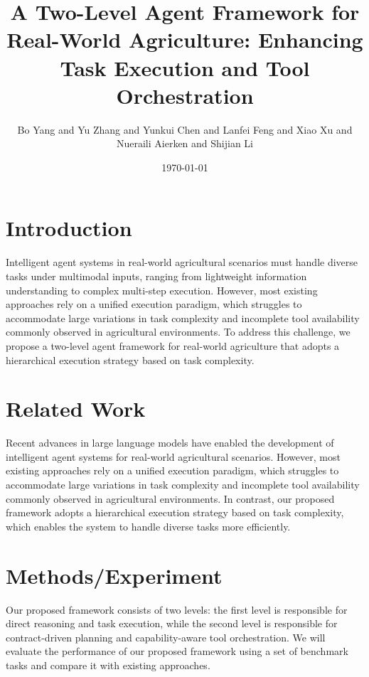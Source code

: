 \documentclass{article}
\begin{document}
        \title{A Two-Level Agent Framework for Real-World Agriculture: Enhancing Task Execution and Tool Orchestration}
        \author{Bo Yang and Yu Zhang and Yunkui Chen and Lanfei Feng and Xiao Xu and Nueraili Aierken and Shijian Li}
        \date{\today}

        \maketitle

        \section{Introduction}
        Intelligent agent systems in real-world agricultural scenarios must handle diverse tasks under multimodal inputs, ranging from lightweight information understanding to complex multi-step execution. However, most existing approaches rely on a unified execution paradigm, which struggles to accommodate large variations in task complexity and incomplete tool availability commonly observed in agricultural environments. To address this challenge, we propose a two-level agent framework for real-world agriculture that adopts a hierarchical execution strategy based on task complexity.

        \section{Related Work}
        Recent advances in large language models have enabled the development of intelligent agent systems for real-world agricultural scenarios. However, most existing approaches rely on a unified execution paradigm, which struggles to accommodate large variations in task complexity and incomplete tool availability commonly observed in agricultural environments. In contrast, our proposed framework adopts a hierarchical execution strategy based on task complexity, which enables the system to handle diverse tasks more efficiently.

        \section{Methods/Experiment}
        Our proposed framework consists of two levels: the first level is responsible for direct reasoning and task execution, while the second level is responsible for contract-driven planning and capability-aware tool orchestration. We will evaluate the performance of our proposed framework using a set of benchmark tasks and compare it with existing approaches.
\end{document}
